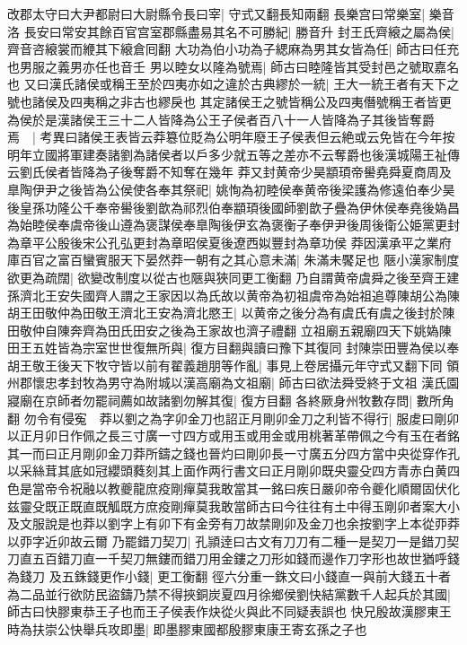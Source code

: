 改郡太守曰大尹都尉曰大尉縣令長曰宰|{
	守式又翻長知兩翻}
長樂宫曰常樂室|{
	樂音洛}
長安曰常安其餘百官宫室郡縣盡易其名不可勝紀|{
	勝音升}
封王氏齊縗之屬為侯|{
	齊音咨縗裳而緶其下縗倉囘翻}
大功為伯小功為子緦麻為男其女皆為任|{
	師古曰任充也男服之義男亦任也音壬}
男以睦女以隆為號焉|{
	師古曰睦隆皆其受封邑之號取嘉名也}
又曰漢氏諸侯或稱王至於四夷亦如之違於古典繆於一統|{
	王大一統王者有天下之號也諸侯及四夷稱之非古也繆戾也}
其定諸侯王之號皆稱公及四夷僭號稱王者皆更為侯於是漢諸侯王三十二人皆降為公王子侯者百八十一人皆降為子其後皆奪爵焉　|{
	考異曰諸侯王表皆云莽簒位貶為公明年廢王子侯表但云絶或云免皆在今年按明年立國將軍建奏諸劉為諸侯者以戶多少就五等之差亦不云奪爵也後漢城陽王祉傳云劉氏侯者皆降為子後奪爵不知奪在幾年}
莽又封黄帝少昊顓頊帝嚳堯舜夏商周及臯陶伊尹之後皆為公侯使各奉其祭祀|{
	姚恂為初睦侯奉黄帝後梁護為修遠伯奉少昊後皇孫功隆公千奉帝嚳後劉歆為祁烈伯奉顓頊後國師劉歆子疊為伊休侯奉堯後媯昌為始睦侯奉虞帝後山遵為褒謀侯奉臯陶後伊玄為褒衡子奉伊尹後周後衛公姫黨更封為章平公殷後宋公孔弘更封為章昭侯夏後遼西姒豐封為章功侯}
莽因漢承平之業府庫百官之富百蠻賓服天下晏然莽一朝有之其心意未滿|{
	朱滿未饜足也}
陿小漢家制度欲更為疏闊|{
	欲變改制度以從古也陿與狹同更工衡翻}
乃自謂黄帝虞舜之後至齊王建孫濟北王安失國齊人謂之王家因以為氏故以黄帝為初祖虞帝為始祖追尊陳胡公為陳胡王田敬仲為田敬王濟北王安為濟北愍王|{
	以黄帝之後分為有虞氏有虞之後封於陳田敬仲自陳奔齊為田氏田安之後為王家故也濟子禮翻}
立祖廟五親廟四天下姚媯陳田王五姓皆為宗室世世復無所與|{
	復方目翻與讀曰豫下其復同}
封陳崇田豐為侯以奉胡王敬王後天下牧守皆以前有翟義趙朋等作亂|{
	事見上卷居攝元年守式又翻下同}
領州郡懷忠孝封牧為男守為附城以漢高廟為文祖廟|{
	師古曰欲法舜受終于文祖}
漢氏園寢廟在京師者勿罷祠薦如故諸劉勿解其復|{
	復方目翻}
各終厥身州牧數存問|{
	數所角翻}
勿令有侵寃　莽以劉之為字卯金刀也詔正月剛卯金刀之利皆不得行|{
	服䖍曰剛卯以正月卯日作佩之長三寸廣一寸四方或用玉或用金或用桃著革帶佩之今有玉在者銘其一而曰正月剛卯金刀莽所鑄之錢也晉灼曰剛卯長一寸廣五分四方當中央從穿作孔以采絲茸其底如冠纓頭蕤刻其上面作两行書文曰正月剛卯既央靈殳四方青赤白黄四色是當帝令祝融以教夔龍庶疫剛癉莫我敢當其一銘曰疾日嚴卯帝令夔化順爾固伏化兹靈殳既正既直既觚既方庶疫剛癉莫我敢當師古曰今往往有土中得玉剛卯者案大小及文服說是也莽以劉字上有卯下有金旁有刀故禁剛卯及金刀也余按劉字上本從丣莽以丣字近卯故云爾}
乃罷錯刀契刀|{
	孔頴逹曰古文有刀刀有二種一是契刀一是錯刀契刀直五百錯刀直一千契刀無鏤而錯刀用金鏤之刀形如錢而邊作刀字形也故世猶呼錢為錢刀}
及五銖錢更作小錢|{
	更工衡翻}
徑六分重一銖文曰小錢直一與前大錢五十者為二品並行欲防民盜鑄乃禁不得挾銅炭夏四月徐鄉侯劉快結黨數千人起兵於其國|{
	師古曰快膠東恭王子也而王子侯表作炔從火與此不同疑表誤也}
快兄殷故漢膠東王時為扶崇公快舉兵攻即墨|{
	即墨膠東國都殷膠東康王寄玄孫之子也}

